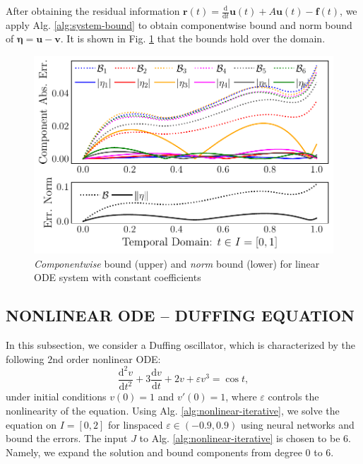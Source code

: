 \documentclass[accepted]{uai2023}
\newcommand{\vect}[1]{\mathbf{#1}}
\newcommand{\Err}{\eta}
\begin{document}
    After obtaining the residual information {\small $\vect{r}(t)=\frac{\mathrm d}{\mathrm d t}\vect{u}(t) + A\vect{u}(t) - \vect{f}(t)$}, we apply Alg. \ref{alg:system-bound} to obtain componentwise bound and norm bound of {\small $\pmb{\Err} = \vect{u}-\vect{v}$}. 
    It is shown in Fig. \ref{fig:system-bound} that the bounds hold over the domain.

    \begin{figure}[!ht]
        \centering
        \includegraphics[width=\linewidth]{assets/system-bound.pdf}
        \caption{\small \textit{Componentwise} bound (upper) and \textit{norm} bound (lower) for linear ODE system with constant coefficients}\label{fig:system-bound}
    \end{figure}

\subsection{NONLINEAR ODE -- DUFFING EQUATION} \label{section:experiment-duffing}
    In this subsection, we consider a Duffing oscillator, which is characterized by the following $2$nd order nonlinear ODE:
    {
        \begin{equation}\label{eq:duffing}
            \frac{\mathrm{d}^2 v}{\mathrm{d}t^2} + 3 \frac{\mathrm{d}v}{\mathrm{d}t} + 2v +\varepsilon v^3 = \cos t ,
        \end{equation}
    }
    under initial conditions $v(0) = 1$ and $v'(0) = 1$, where $\varepsilon$ controls the nonlinearity of the equation. 
    Using Alg. \ref{alg:nonlinear-iterative}, we solve the equation on $I=[0, 2]$ for linspaced $\varepsilon \in (-0.9, 0.9)$ using neural networks and bound the errors. 
    The input $J$ to Alg. \ref{alg:nonlinear-iterative} is chosen to be $6$. 
    Namely, we expand the solution and bound components from degree $0$ to $6$.
\end{document}
